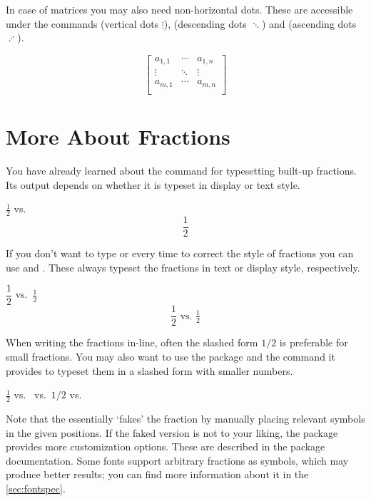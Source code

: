 In case of matrices you may also need non-horizontal dots. These are accessible
under the commands  (vertical dots \(\vdots\)), 
(descending dots \(\ddots\)) and  (ascending dots \(\adots\)).
\begin{example}
\[ \begin{bmatrix}
  a_{1,1} & \cdots  & a_{1,n} \\
  \vdots  & \ddots  & \vdots  \\
  a_{m,1} & \cdots  & a_{m,n} \\
\end{bmatrix} \]
\end{example}

\section{More About Fractions}\label{sec:fractions}

You have already learned about the  command for typesetting built-up
fractions. Its output depends on whether it is typeset in display or text
style.
\begin{example}
\( \frac{1}{2} \) vs.\
\[ \frac{1}{2} \]
\end{example}

If you don't want to type  or  every time to
correct the style of fractions you can use \csi{tfrac} and \csi{dfrac}. These
always typeset the fractions in text or display style, respectively.
\begin{example}
\( \dfrac{1}{2} \) vs.\
\( \tfrac{1}{2} \)
\[ \dfrac{1}{2}\text{ vs.\ }
  \tfrac{1}{2} \]
\end{example}

When writing the fractions in-line, often the slashed form \(1/2\) is
preferable for small fractions. You may also want to use the 
package and the \csi{sfrac} command it provides to typeset them in a slashed
form with smaller numbers.
\begin{example}
\( \frac{1}{2} \) vs.\ 
 vs.\ 
\( 1/2 \) vs.\ \textonehalf{}
\end{example}
Note that the  essentially \enquote*{fakes} the fraction by manually
placing relevant symbols in the given positions. If the faked version is not to
your liking, the package provides more customization options. These are
described in the package documentation. Some fonts support arbitrary fractions
as symbols, which may produce better results; you can find more information
about it in the \autoref{sec:fontspec}.

